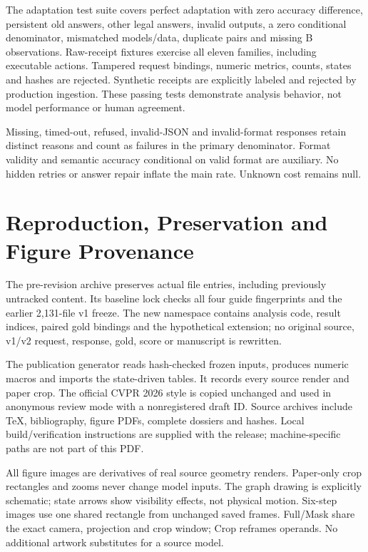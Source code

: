 \documentclass[10pt,letterpaper]{article}
\begin{document}
The adaptation test suite covers perfect adaptation with zero accuracy
difference, persistent old answers, other legal answers, invalid
outputs, a zero conditional denominator, mismatched models/data,
duplicate pairs and missing B observations. Raw-receipt fixtures
exercise all eleven families, including executable actions.
Tampered request bindings, numeric metrics, counts, states and hashes
are rejected. Synthetic receipts are explicitly labeled and rejected
by production ingestion. These passing tests demonstrate analysis
behavior, not model performance or human agreement.

Missing, timed-out, refused, invalid-JSON and invalid-format responses
retain distinct reasons and count as failures in the primary
denominator. Format validity and semantic accuracy conditional on
valid format are auxiliary. No hidden retries or answer repair
inflate the main rate. Unknown cost remains null.

\section{Reproduction, Preservation and Figure Provenance}
The pre-revision archive preserves \EvFrozenFiles{} actual file entries, including
previously untracked content. Its baseline lock checks all four guide
fingerprints and the earlier 2,131-file v1 freeze. The new namespace
contains analysis code, result indices, paired gold bindings and the
hypothetical extension; no original source, v1/v2 request, response,
gold, score or manuscript is rewritten.

The publication generator reads hash-checked frozen inputs, produces
numeric macros and imports the state-driven tables. It records every
source render and paper crop. The official CVPR 2026 style is copied
unchanged and used in anonymous review mode with a nonregistered draft
ID. Source archives include TeX, bibliography, figure PDFs, complete
dossiers and hashes. Local build/verification instructions are supplied
with the release; machine-specific paths are not part of this PDF.

All figure images are derivatives of real source geometry renders.
Paper-only crop rectangles and zooms never change model inputs.
The graph drawing is explicitly schematic; state arrows show visibility
effects, not physical motion. Six-step images use one shared rectangle
from unchanged saved frames. Full/Mask share the exact camera,
projection and crop window; Crop reframes operands. No additional
artwork substitutes for a source model.
\end{document}
